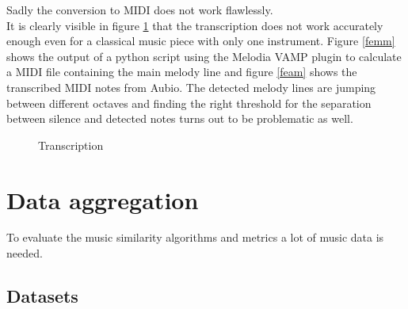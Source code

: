 Sadly the conversion to MIDI does not work flawlessly.\\
It is clearly visible in figure \ref{fig:transc} that the transcription does not work accurately enough even for a classical music piece with only one instrument. Figure \ref{femm} shows the output of a python script using the Melodia VAMP plugin to calculate a MIDI file containing the main melody line and figure \ref{feam} shows the transcribed MIDI notes from Aubio. The detected melody lines are jumping between different octaves and finding the right threshold for the separation between silence and detected notes turns out to be problematic as well.

\begin{figure}[htbp]
	\centering
	\caption{Transcription}
	\label{fig:transc}
\end{figure}
\FloatBarrier 

\chapter{Data aggregation}

To evaluate the music similarity algorithms and metrics a lot of music data is needed.

\section{Datasets}\label{datasets}

